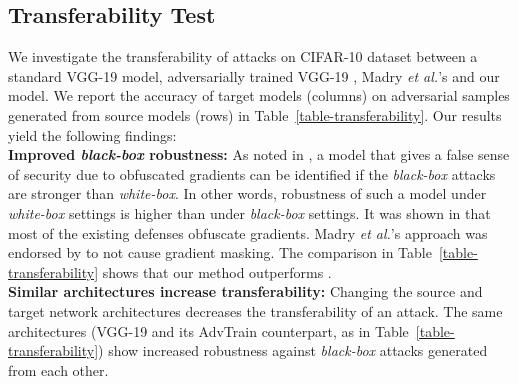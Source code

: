 \documentclass[10pt,twocolumn,letterpaper]{article}
\begin{document}
\subsection{Transferability Test}
\vspace{-0.50em}
We investigate the transferability of attacks on CIFAR-10 dataset between a standard VGG-19 model, adversarially trained VGG-19 \cite{kurakin2016adversarial_2}, Madry \textit{et al.}'s \cite{madry2017towards} and our model. We report the accuracy of target models (columns) on adversarial samples generated from source models (rows) in Table~\ref{table-transferability}. Our results yield the following findings: \vspace{1mm} \\ 
\textbf{Improved \textit{black-box} robustness:} As noted in \cite{athalye2018obfuscated}, a model that gives a false sense of security due to obfuscated gradients can be identified if the \textit{black-box} attacks are stronger than \textit{white-box}. In other words, robustness of such a model under \textit{white-box} settings is higher than under \textit{black-box} settings. It was shown in \cite{athalye2018obfuscated} that most of the existing defenses obfuscate gradients. Madry \emph{et al.}'s approach \cite{madry2017towards} was endorsed by \cite{athalye2018obfuscated} to not cause gradient masking. The comparison in Table~\ref{table-transferability} shows that our method outperforms \cite{madry2017towards}.\vspace{1mm}\\ 
\textbf{Similar architectures increase transferability:} Changing the source and target network architectures decreases the transferability of an attack. The same architectures (\eg VGG-19 and its AdvTrain counterpart, as in Table~\ref{table-transferability}) show increased robustness against \textit{black-box} attacks generated from each other.
\end{document}

